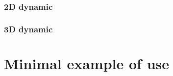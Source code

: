 \documentclass[12pt, a4paper]{article}
\begin{document}

\begin{scriptsize}
\begin{ttfamily}

\end{ttfamily}
\end{scriptsize}

\subsubsection{2D dynamic}


\begin{scriptsize}
\begin{ttfamily}

\end{ttfamily}
\end{scriptsize}


\begin{scriptsize}
\begin{ttfamily}

\end{ttfamily}
\end{scriptsize}

\subsubsection{3D dynamic}


\begin{scriptsize}
\begin{ttfamily}

\end{ttfamily}
\end{scriptsize}


\begin{scriptsize}
\begin{ttfamily}

\end{ttfamily}
\end{scriptsize}

\section{Minimal example of use}
\end{document}
